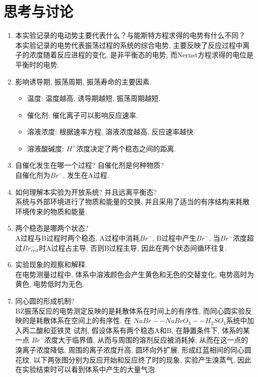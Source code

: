 \documentclass[a4paper]{article}
\begin{document}
\section{思考与讨论}
\begin{enumerate}
	\item 本实验记录的电动势主要代表什么？与能斯特方程求得的电势有什么不同？\\
	本实验记录的电势代表振荡过程的系统的综合电势,
	主要反映了反应过程中离子的浓度随着反应进程的变化, 
	是非平衡态的电势, 而Nernst方程求得的电位是平衡时的电势.
	\item 影响诱导期, 振荡周期, 振荡寿命的主要因素.
	\begin{itemize}
		\item 温度: 温度越高, 诱导期越短, 振荡周期越短.
		\item 催化剂: 催化离子可以影响反应速率.
		\item 溶液浓度: 根据速率方程, 溶液浓度越高, 反应速率越快.
		\item 溶液酸碱度: $H^{+}$浓度决定了两个稳态之间的距离. 
	\end{itemize}
	\item 自催化发生在哪一个过程? 自催化剂是何种物质?\\
	自催化剂为$Br^{-}$, 发生在A过程.
	\item 如何理解本实验为开放系统? 并且远离平衡态?\\
	系统与外部环境进行了物质和能量的交换, 
	并且采用了适当的有序结构来耗散环境传来的物质和能量.
	\item 两个稳态是哪两个状态?\\
	A过程与B过程时两个稳态, A过程中消耗$Br^{-}$, B过程中产生$Br^{-}$, 
	当$Br^{-}$浓度超过$Br^{-}_{crit}$时A过程占主导,
	否则B过程主导, 因此在两个状态间循环往复.
	\item 实验现象的观察和解释.\\
	在电势测量过程中, 体系中溶液颜色会产生黄色和无色的交替变化,
	电势高时为黄色, 电势低时为无色. 
	\item 同心圆的形成机制?\\
	BZ振荡反应的电势测定反映的是耗散体系在时间上的有序性,
	而同心圆实验反映的是耗散体系在空间上的有序性. 在
	$NaBr -- NaBrO_{3} -- H_{2}SO_{4}$系统中加入丙二酸和亚铁灵
	试剂, 假设体系有两个稳态A和B, 在静置条件下, 体系的某一点
	$Br^{-}$浓度大于临界值, 从而与周围的溶剂反应被消耗掉, 
	从而在这一点的溴离子浓度降低, 周围的离子浓度升高, 圆环向外扩展,
	形成红蓝相间的同心圆花纹. 以下两张图分别为反应开始和反应终了时的现象. 实验产生溴蒸气, 
	因此在实验结束时可以看到体系中产生的大量气泡.
	\begin{figure}[!h]

\end{figure}
\end{enumerate}
\end{document}
